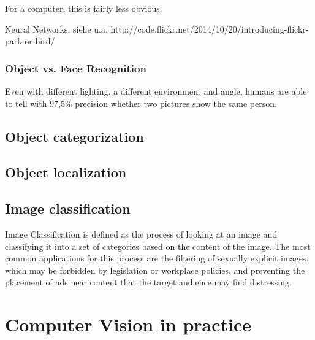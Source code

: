 \documentclass[twoside,a4paper]{article}
\begin{document}
For a computer, this is fairly less obvious.

Neural Networks, siehe u.a.
http://code.flickr.net/2014/10/20/introducing-flickr-park-or-bird/

\subsubsection{Object vs. Face Recognition}
\label{subsec:object_vs_face}

Even with different lighting, a different environment and angle, humans are able to tell with 97,5\% precision whether two pictures show the same person\cite{Taigman_2014_CVPR}.



\subsection{Object categorization}
\label{sec:object_cat}


\subsection{Object localization}
\label{sec:object_loc}

\subsection{Image classification}
\label{sec:img_cls}
Image Classification is defined as the process of looking at an image and classifying it into a set of categories\cite{forsyth2012computer} based on the content of the image. The most common applications for this process are the filtering of sexually explicit images. which may be forbidden by legislation or workplace policies, and preventing the placement of ads near content that the target audience may find distressing.


\section{Computer Vision in practice}
\label{sec:zusammenhang}
\end{document}
